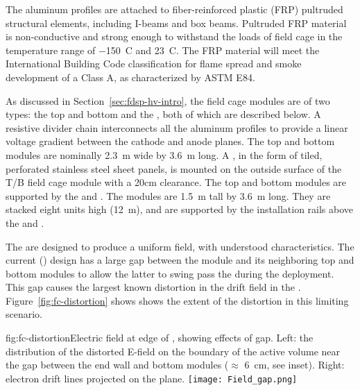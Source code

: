 The aluminum profiles are attached to fiber-reinforced plastic (FRP) pultruded structural elements, including I-beams and box beams.  
Pultruded FRP material is non-conductive and strong enough to withstand the loads of field cage in the temperature range of \SI{-150}{C} and \SI{23}{C}.
The FRP material will meet the International Building Code classification for flame spread and smoke development of a Class A, as characterized by ASTM E84.  

As discussed in Section~\ref{sec:fdsp-hv-intro}, %
the field cage modules are of two types: the top and bottom  and the , both of which are described below. 
A resistive divider chain interconnects all the aluminum profiles to provide a linear voltage gradient between the cathode and anode planes.  The top and bottom modules are nominally \SI{2.3}{\meter} wide by \SI{3.6}{\meter} long. A , in the form of tiled, perforated stainless steel sheet panels, is mounted on the outside surface of the T/B field cage module with a 20cm clearance. The top and bottom  modules are supported by the  and . The  modules are \SI{1.5}{\meter} tall by \SI{3.6}{\meter} long. They are stacked eight units high (\SI{12}{\meter}), and are supported by the installation rails above the  and .

The  are designed to produce a uniform field, with understood characteristics.
The current ()  design has a large gap between the  module and its neighboring top and bottom modules to allow the latter to swing pass the  during the  deployment. This gap causes the largest known distortion in the drift field in the . Figure~\ref{fig:fc-distortion} shows shows the extent of the distortion in this limiting scenario.

\begin{dunefigure}{fig:fc-distortion}{Electric field at edge of , showing effects of gap. Left: the distribution of the distorted E-field on the boundary of the active volume near the gap between the end wall and bottom  modules ($\approx$ \SI{6}{\centi\meter}, see inset).  Right: electron drift lines projected on the %
 plane.}
\texttt{[image: Field\_gap.png]}
\end{dunefigure}

